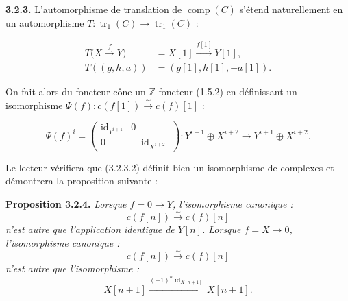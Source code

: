 \clearpage
{}%
\noindent\textbf{3.2.3.}\quad
{}
L'automorphisme de translation de $\operatorname{comp}(C)$ s'étend
naturellement en un automorphisme
$T\colon\operatorname{tr}_1(C)\longrightarrow\operatorname{tr}_1(C)$ :

\begin{equation}
  \begin{aligned}
    T\bigl(X\xrightarrow{f}Y\bigr)
      &=X[1]\xrightarrow{f[1]}Y[1],\\
    T((g,h,a))&=(g[1],h[1],-a[1]).
  \end{aligned}
  \tag{3.2.3.1}
\end{equation}

On fait alors du foncteur cône un $\mathbb Z$-foncteur (1.5.2) en définissant
un isomorphisme
$\Psi(f)\colon c(f[1])\xrightarrow{\sim}c(f)[1]$ :

\begin{equation}
  \Psi(f)^i=
  \begin{pmatrix}
    \operatorname{id}_{Y^{i+1}} & 0\\
    0 & -\operatorname{id}_{X^{i+2}}
  \end{pmatrix}
  \colon Y^{i+1}\oplus X^{i+2}
  \longrightarrow Y^{i+1}\oplus X^{i+2}.
  \tag{3.2.3.2}
\end{equation}

Le lecteur vérifiera que (3.2.3.2) définit bien un isomorphisme de complexes
et démontrera la proposition suivante :

\noindent\textbf{Proposition 3.2.4.}\quad
{}
\emph{Lorsque $f=0\longrightarrow Y$, l'isomorphisme canonique :}
\begin{equation*}
  c(f[n])\xrightarrow{\sim}c(f)[n]
\end{equation*}
\emph{n'est autre que l'application identique de $Y[n]$. Lorsque
$f=X\longrightarrow0$, l'isomorphisme canonique :}
\begin{equation*}
  c(f[n])\xrightarrow{\sim}c(f)[n]
\end{equation*}
\emph{n'est autre que l'isomorphisme :}
\begin{equation*}
  X[n+1]\xrightarrow{(-1)^n\operatorname{id}_{X[n+1]}}X[n+1].
\end{equation*}

